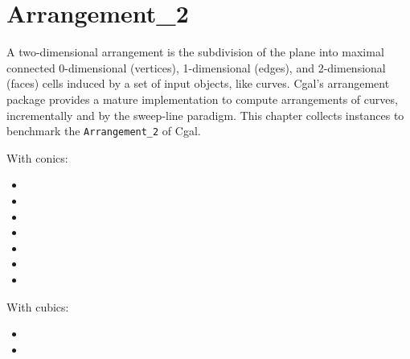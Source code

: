 \section{Arrangement\_2\label{bi_sec:Arrangement2}}

A two-dimensional arrangement is the subdivision of the plane into
maximal connected 0-dimensional (vertices), 1-dimensional (edges), 
and 2-dimensional (faces) cells induced by a set of input objects, like
curves. {\sc Cgal}'s arrangement package provides a mature implementation
to compute arrangements of curves, incrementally and by the sweep-line
paradigm. This chapter collects instances to benchmark the 
{\tt Arrangement\_2} of {\sc Cgal}.

With conics:
\begin{itemize}
\item {}
\item {}
\item {}
\item {}
\item {}
\item {}
\item {}
\end{itemize}

With cubics:
\begin{itemize}
\item {}
\item {}
\end{itemize}

